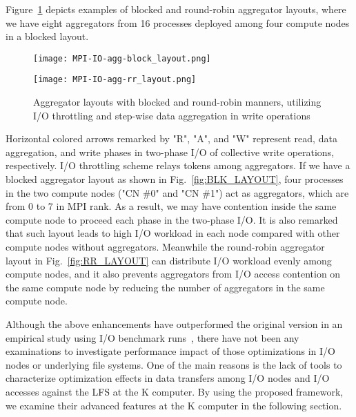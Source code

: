 \documentclass{jhps}
\begin{document}
Figure~\ref{fig:AGG_RR_LAYOUT} depicts examples of blocked and round-robin
aggregator layouts, where we have eight aggregators from 16 processes
deployed among four compute nodes in a blocked layout.
%
\begin{figure}[tb]
\centering
\begin{minipage}[t]{0.36\textwidth}
\centering
\texttt{[image: MPI-IO-agg-block\_layout.png]}
\label{fig:BLK_LAYOUT}
\end{minipage}
\noindent
\begin{minipage}[t]{0.36\textwidth}
\centering
\texttt{[image: MPI-IO-agg-rr\_layout.png]}
\label{fig:RR_LAYOUT}
\end{minipage}
\caption{Aggregator layouts with blocked and round-robin manners,
utilizing I/O throttling and step-wise data aggregation in write operations}
\label{fig:AGG_RR_LAYOUT}
\end{figure}
%
Horizontal colored arrows remarked by "R", "A", and "W" represent
read, data aggregation, and write phases in two-phase I/O of collective write
operations, respectively.
I/O throttling scheme relays tokens among aggregators.
If we have a blocked aggregator layout as shown in
Fig.~\ref{fig:BLK_LAYOUT},
four processes in the two compute nodes ("CN \#0" and "CN \#1")
act as aggregators, which are from 0 to 7 in MPI rank.
As a result, we may have contention inside the same compute node
to proceed each phase in the two-phase I/O.
It is also remarked that such layout leads to high I/O workload
in each node compared with other compute nodes without aggregators.
Meanwhile the round-robin aggregator layout in
Fig.~\ref{fig:RR_LAYOUT}
can distribute I/O workload evenly
among compute nodes, and it also prevents aggregators
from I/O access contention on the same compute node
by reducing the number of aggregators in the same compute node.

Although the above enhancements have outperformed the original version
in an empirical study using I/O benchmark runs~\cite{tsujita:WS_EuroMPI2014,tsujita:hpcasia18},
there have not been any examinations to investigate performance impact
of those optimizations in I/O nodes or underlying file systems.
One of the main reasons is the lack of tools to characterize optimization
effects in data transfers among I/O nodes and I/O accesses
against the LFS at the K computer.
By using the proposed framework, we examine their advanced features
at the K computer in the following section.
\end{document}

